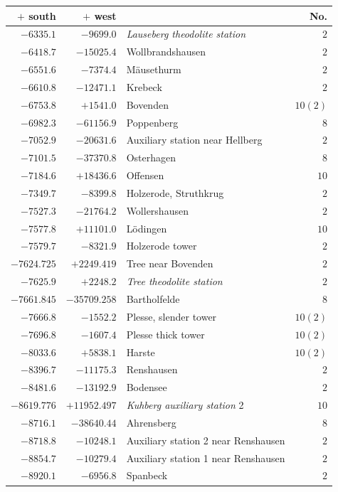 \begin{center}\begingroup\fontsize{8}{9}\selectfont
\setlength{\tabcolsep}{4pt}
\begin{tabular}{r|r|p{170pt}|r}\hline
\(+\) south&\(+\) west&&No.\\\hline
\(-6335.1\)&\(-9699.0\)&\textit{Lauseberg theodolite station}&\(2\)\\
\(-6418.7\)&\(-15025.4\)&Wollbrandshausen&\(2\)\\
\(-6551.6\)&\(-7374.4\)&Mäusethurm&\(2\)\\
\(-6610.8\)&\(-12471.1\)&Krebeck&\(2\)\\
\(-6753.8\)&\(+1541.0\)&Bovenden&\(10 (2)\)\\
\(-6982.3\)&\(-61156.9\)&Poppenberg&\(8\)\\
\(-7052.9\)&\(-20631.6\)&Auxiliary station near Hellberg&\(2\)\\
\(-7101.5\)&\(-37370.8\)&Osterhagen&\(8\)\\
\(-7184.6\)&\(+18436.6\)&Offensen&\(10\)\\
\(-7349.7\)&\(-8399.8\)&Holzerode, Struthkrug&\(2\)\\
\(-7527.3\)&\(-21764.2\)&Wollershausen&\(2\)\\
\(-7577.8\)&\(+11101.0\)&Lödingen&\(10\)\\
\(-7579.7\)&\(-8321.9\)&Holzerode tower&\(2\)\\
\(-7624.725\)&\(+2249.419\)&Tree near Bovenden&\(2\)\\
\(-7625.9\)&\(+2248.2\)&\textit{Tree theodolite station}&\(2\)\\
\(-7661.845\)&\(-35709.258\)&Bartholfelde&\(8\)\\
\(-7666.8\)&\(-1552.2\)&Plesse, slender tower&\(10 (2)\)\\
\(-7696.8\)&\(-1607.4\)&Plesse thick tower&\(10 (2)\)\\
\(-8033.6\)&\(+5838.1\)&Harste&\(10 (2)\)\\
\(-8396.7\)&\(-11175.3\)&Renshausen&\(2\)\\
\(-8481.6\)&\(-13192.9\)&Bodensee&\(2\)\\
\(-8619.776\)&\(+11952.497\)&\textit{Kuhberg auxiliary station} 2&\(10\)\\
\(-8716.1\)&\(-38640.44\)&Ahrensberg&\(8\)\\
\(-8718.8\)&\(-10248.1\)&Auxiliary station 2 near Renshausen&\(2\)\\
\(-8854.7\)&\(-10279.4\)&Auxiliary station 1 near Renshausen&\(2\)\\
\(-8920.1\)&\(-6956.8\)&Spanbeck&\(2\)\\

\end{tabular}
\end{center}
